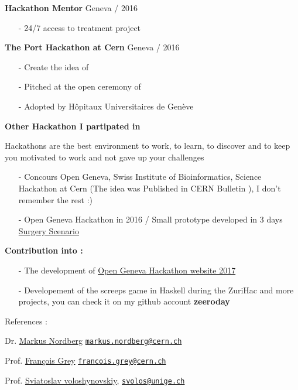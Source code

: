 \documentclass[a4paper,12pt]{article}
\begin{document}
\textbf{Hackathon Mentor} \hfill Geneva / 2016

\begin{itemize}
    \item[-]24/7 access to treatment project  \href{http://www.connect2effect.com/}{\color{blue}{INFLUX TRUST HACKATHON}}
\end{itemize}

\textbf{The Port Hackathon at Cern} \hfill Geneva / 2016
\begin{itemize}
    \item[-] Create the idea of \href{https://twitter.com/uRegSwitzerland}{\color{blue}{ \faTwitter Personal Health Wallet}}
    \item[-] Pitched at the open ceremony of \href{http://ghf2016.g2hp.net/}{\color{blue}{Geneva Health Forum}}
    \item[-] Adopted by Hôpitaux Universitaires de Genève
\end{itemize}

\vspace{1.2mm}

\textbf{Other Hackathon I partipated in} \hfill

Hackathons are the best environment to work, to learn, to discover and to keep you motivated to work and not gave up your challenges 
\begin{itemize}
\item[-] Concours Open Geneva, Swiss Institute of Bioinformatics, Science Hackathon at Cern  (The idea was Published in CERN Bulletin ), I don't remember the rest :)
\item[-]  Open Geneva Hackathon in 2016 / Small prototype developed in 3 days
\href{https://github.com/zeeroday/hackathon-2016}{{\color{blue}Surgery Scenario}}
\end{itemize}


\textbf{Contribution into :} \hfill

\begin{itemize}
\item[-] The development of \href{http://opengenevahackathons.org/}{{\color{blue}Open Geneva Hackathon website 2017}}
\item[-] Developement of the screeps game in Haskell during the ZuriHac 
and more projects, you can check it on my github account \textbf{zeeroday}
\end{itemize}



{\fontsize{10}{10}\selectfont \quad References : 

Dr. \href{https://nordberg.web.cern.ch/nordberg/}{{\color{blue} Markus Nordberg}} \href{mailto:svolos@unige.ch}{\nolinkurl{markus.nordberg@cern.ch}}

Prof. \href{http://cui.unige.ch/~grey/}{{\color{blue}François Grey}}
\href{mailto:francois.grey@cern.ch }{\nolinkurl{francois.grey@cern.ch}}}

Prof. \href{http://sip.unige.ch/team/prof-sviatoslav-voloshynovskiy/}{{\color{blue}Sviatoslav voloshynovskiy}},
\href{mailto:svolos@unige.ch}{\nolinkurl{svolos@unige.ch}}
\end{document}
